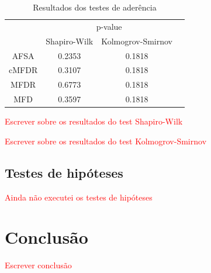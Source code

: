 \documentclass[conference]{IEEEtran}
\begin{document}
\begin{table}[h]
	\centering
	\caption{Resultados dos testes de aderência}
	\label{tab:aderencia}
	\begin{tabular}{c|ccc}
		\hline
		& \multicolumn{2}{c}{p-value}      \\
		\cline{2-3}
		& Shapiro-Wilk & Kolmogrov-Smirnov \\
		\hline
		AFSA  & 0.2353       & 0.1818            \\
		cMFDR & 0.3107       & 0.1818            \\
		MFDR  & 0.6773       & 0.1818            \\
		MFD   & 0.3597       &  0.1818               \\
		\hline
	\end{tabular}
\end{table}

\textcolor{red}{Escrever sobre os resultados do test Shapiro-Wilk}

\textcolor{red}{Escrever sobre os resultados do test Kolmogrov-Smirnov}

\subsection{Testes de hipóteses}

\textcolor{red}{Ainda não executei os testes de hipóteses}

\section{Conclusão}
\label{sec:conclusao}

\textcolor{red}{Escrever conclusão}




% 

\end{document}
